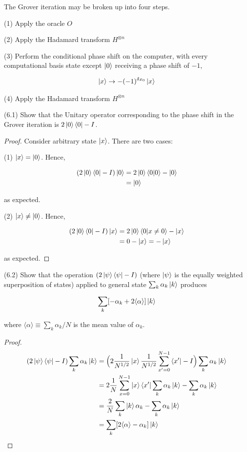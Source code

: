 \documentclass[main.tex]{subfiles}
\begin{document}
\begin{subappendices}
The Grover iteration may be broken up into four steps.

(1) Apply the oracle $O$

(2) Apply the Hadamard transform $H^{\otimes n}$

(3) Perform the conditional phase shift on the computer, with every computational basis
state except $\ket{0}$ receiving a phase shift of $-1$,

$$ \ket{x} \rightarrow -(-1)^{\delta x_0} \ket{x} $$

(4) Apply the Hadamard transform $H^{\otimes n}$

\begin{exercise}(6.1) Show that the Unitary operator corresponding to the phase shift in the Grover iteration is $2 \ket{0}\bra{0} - I$.
	\begin{proof}
	Consider arbitrary state $\ket{x}$. There are two cases:
	
	(1) $\ket{x} = \ket{0}$. Hence, 
	
	\begin{align*}
 	(2 \ket{0}\bra{0} - I)\ket{0} &= 2\ket{0}\bra{0}\ket{0} - \ket{0} \\
 	&= \ket{0}
 \end{align*}

as expected.

(2) $\ket{x} \neq \ket{0}$. Hence, 
	
	\begin{align*}
 	(2 \ket{0}\bra{0} - I)\ket{x} &= 2\ket{0}\bra{0}\ket{x \neq 0} - \ket{x} \\
 	&= 0 - \ket{x} = -\ket{x}
 \end{align*}

as expected.
	\end{proof}

\end{exercise}

\begin{exercise}(6.2) Show that the operation $(2 \ket{\psi}\bra{\psi} - I)$ (where $\ket{\psi}$ is the equally weighted superposition of states) applied to general state $\sum_k \alpha_k \ket{k}$ produces 

\begin{align*}
\sum_k [ -\alpha_k + 2\langle \alpha \rangle ] \ket{k}	
\end{align*}
	
	where $\langle \alpha \rangle \equiv \sum_k \alpha_k / N$ is the mean value of $\alpha_k$. 
	
	\begin{proof}
		\begin{align*}
			(2 \ket{\psi}\bra{\psi} - I) \sum_k \alpha_k \ket{k} &= \Big(2\frac{1}{N^{1/2}}\ket{x} \frac{1}{N^{1/2}} \sum_{x'=0}^{N-1} \bra{x'} - I\Big)\sum_k \alpha_k \ket{k} \\
			&= 2\frac{1}{N} \sum_{x=0}^{N-1} \ket{x}\bra{x'}\sum_k \alpha_k \ket{k} -\sum_k \alpha_k \ket{k} \\
			&= \frac{2}{N} \sum_k \ket{k}  \alpha_k -\sum_k \alpha_k \ket{k} \\
			&= \sum_k [ 2\langle \alpha \rangle -\alpha_k ] \ket{k}
		\end{align*}


\end{proof}
\end{exercise}
\end{subappendices}
\end{document}
